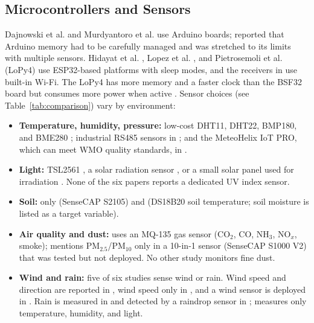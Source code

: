 \documentclass[conference]{IEEEtran}
\begin{document}
\subsection{Microcontrollers and Sensors}
Dajnowski et al. \cite{dajnowski2024} and Murdyantoro et al. \cite{murdyantoro2019} use Arduino boards; \cite{dajnowski2024} reported that Arduino memory had to be carefully managed and was stretched to its limits with multiple sensors. Hidayat et al. \cite{hidayat2019}, Lopez et al. \cite{lopez2025}, and Pietrosemoli et al. (LoPy4) \cite{pietrosemoli2019} use ESP32-based platforms with sleep modes, and the receivers in \cite{hidayat2019, lopez2025} use built-in Wi-Fi. The LoPy4 has more memory and a faster clock than the BSF32 board but consumes more power when active \cite{pietrosemoli2019}. Sensor choices (see Table~\ref{tab:comparison}) vary by environment:
\begin{itemize}
    \item \textbf{Temperature, humidity, pressure:} low-cost DHT11, DHT22, BMP180, and BME280 \cite{dajnowski2024, hidayat2019, pietrosemoli2019, murdyantoro2019}; industrial RS485 sensors in \cite{lopez2025}; and the MeteoHelix IoT PRO, which can meet WMO quality standards, in \cite{zennaro2025}.
    \item \textbf{Light:} TSL2561 \cite{hidayat2019}, a solar radiation sensor \cite{lopez2025}, or a small solar panel used for irradiation \cite{zennaro2025}. None of the six papers reports a dedicated UV index sensor.
    \item \textbf{Soil:} only \cite{zennaro2025} (SenseCAP S2105) and \cite{lopez2025} (DS18B20 soil temperature; soil moisture is listed as a target variable).
    \item \textbf{Air quality and dust:} \cite{dajnowski2024} uses an MQ-135 gas sensor (CO$_2$, CO, NH$_3$, NO$_x$, smoke); \cite{zennaro2025} mentions PM$_{2.5}$/PM$_{10}$ only in a 10-in-1 sensor (SenseCAP S1000 V2) that was tested but not deployed. No other study monitors fine dust.
    \item \textbf{Wind and rain:} five of six studies sense wind or rain. Wind speed and direction are reported in \cite{dajnowski2024, lopez2025, pietrosemoli2019}, wind speed only in \cite{murdyantoro2019}, and a wind sensor is deployed in \cite{zennaro2025}. Rain is measured in \cite{dajnowski2024, zennaro2025, pietrosemoli2019} and detected by a raindrop sensor in \cite{murdyantoro2019}; \cite{hidayat2019} measures only temperature, humidity, and light.
\end{itemize}
\end{document}
